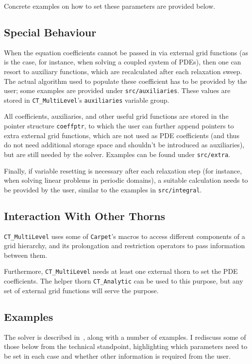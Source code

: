 Concrete examples on how to set these parameters are provided
below.

\subsection{Special Behaviour}
When the equation coefficients cannot be passed in via external
grid functions (as is the case, for instance, when solving a
coupled system of PDEs), then one can resort to auxiliary functions,
which are recalculated after each relaxation sweep. The actual
algorithm used to populate these coefficient has to be provided
by the user; some examples are provided under \texttt{src/auxiliaries}.
These values are stored in \texttt{CT\_MultiLevel}'s \texttt{auxiliaries}
variable group.

All coefficients, auxiliaries, and other useful grid functions are
stored in the pointer structure \texttt{coeffptr}, to which the user
can further append pointers to extra external grid functions, which 
are not used as PDE coefficients (and thus do not need additional 
storage space and shouldn't be introduced as auxiliaries), but are 
still needed by the solver. Examples can be found under 
\texttt{src/extra}.
 
Finally, if variable resetting is necessary after each relaxation
step (for instance, when solving linear problems in periodic domains),
a suitable calculation needs to be provided by the user, similar to
the examples in \texttt{src/integral}.

\subsection{Interaction With Other Thorns}
\texttt{CT\_MultiLevel} uses some of \texttt{Carpet}'s macros to
access different components of a grid hierarchy, and its prolongation
and restriction operators to pass information between them.

Furthermore, \texttt{CT\_MultiLevel} needs at least one external
thorn to set the PDE coefficients. The helper thorn \texttt{CT\_Analytic}
can be used to this purpose, but any set of external grid functions 
will serve the purpose.

\subsection{Examples}
The solver is described in~\cite{Bentivegna:2013xna}, along with a number
of examples. I rediscuss some of those below from the technical
standpoint, highlighting which parameters need to be set in each case
and whether other information is required from the user.

